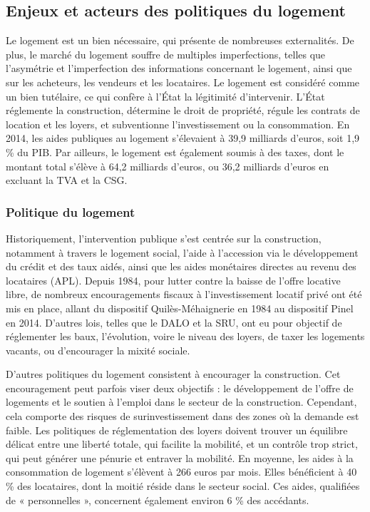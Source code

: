 \documentclass[a4paper, 12pt]{report}
\begin{document}
\subsection{Enjeux et acteurs des politiques du logement}



Le logement est un bien nécessaire, qui présente de nombreuses externalités. De plus, le marché du logement souffre de multiples imperfections, telles que l'asymétrie et l'imperfection des informations concernant le logement, ainsi que sur les acheteurs, les vendeurs et les locataires. Le logement est considéré comme un bien tutélaire, ce qui confère à l'État la légitimité d'intervenir. L'État réglemente la construction, détermine le droit de propriété, régule les contrats de location et les loyers, et subventionne l’investissement ou la consommation. En 2014, les aides publiques au logement s'élevaient à 39,9 milliards d’euros, soit 1,9 \% du PIB. Par ailleurs, le logement est également soumis à des taxes, dont le montant total s’élève à 64,2 milliards d’euros, ou 36,2 milliards d’euros en excluant la TVA et la CSG.

\subsubsection{Politique du logement}

Historiquement, l’intervention publique s’est centrée sur la construction, notamment à travers le logement social, l’aide à l’accession via le développement du crédit et des taux aidés, ainsi que les aides monétaires directes au revenu des locataires (APL). Depuis 1984, pour lutter contre la baisse de l’offre locative libre, de nombreux encouragements fiscaux à l’investissement locatif privé ont été mis en place, allant du dispositif Quilès-Méhaignerie en 1984 au dispositif Pinel en 2014. D’autres lois, telles que le DALO et la SRU, ont eu pour objectif de réglementer les baux, l’évolution, voire le niveau des loyers, de taxer les logements vacants, ou d’encourager la mixité sociale.

D’autres politiques du logement consistent à encourager la construction. Cet encouragement peut parfois viser deux objectifs : le développement de l’offre de logements et le soutien à l’emploi dans le secteur de la construction. Cependant, cela comporte des risques de surinvestissement dans des zones où la demande est faible. Les politiques de réglementation des loyers doivent trouver un équilibre délicat entre une liberté totale, qui facilite la mobilité, et un contrôle trop strict, qui peut générer une pénurie et entraver la mobilité. En moyenne, les aides à la consommation de logement s’élèvent à 266 euros par mois. Elles bénéficient à 40 \% des locataires, dont la moitié réside dans le secteur social. Ces aides, qualifiées de « personnelles », concernent également environ 6 \% des accédants.
\end{document}

